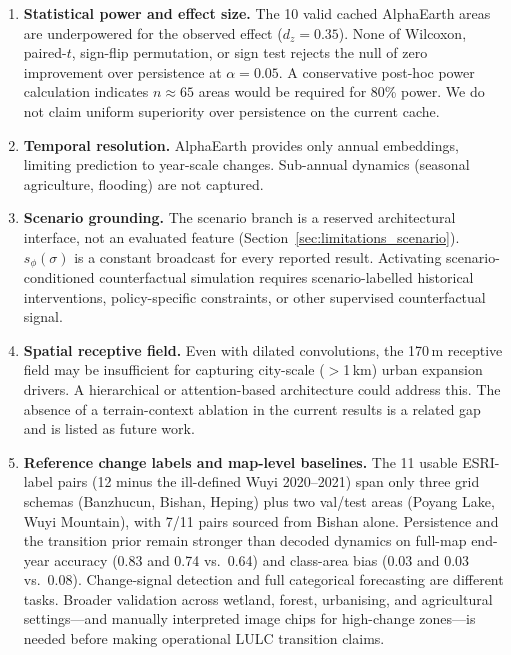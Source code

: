 \documentclass{article}
\begin{document}
\begin{enumerate}
\item \label{lim:power} \textbf{Statistical power and effect size.} The 10 valid cached AlphaEarth areas are underpowered for the observed effect ($d_z=0.35$). None of Wilcoxon, paired-$t$, sign-flip permutation, or sign test rejects the null of zero improvement over persistence at $\alpha=0.05$. A conservative post-hoc power calculation indicates $n \approx 65$ areas would be required for 80\% power. We do not claim uniform superiority over persistence on the current cache.

\item \label{lim:temporal} \textbf{Temporal resolution.} AlphaEarth provides only annual embeddings, limiting prediction to year-scale changes. Sub-annual dynamics (seasonal agriculture, flooding) are not captured.

\item \label{lim:scenario} \textbf{Scenario grounding.} The scenario branch is a reserved architectural interface, not an evaluated feature (Section~\ref{sec:limitations_scenario}). $s_\phi(\sigma)$ is a constant broadcast for every reported result. Activating scenario-conditioned counterfactual simulation requires scenario-labelled historical interventions, policy-specific constraints, or other supervised counterfactual signal.

\item \label{lim:receptive} \textbf{Spatial receptive field.} Even with dilated convolutions, the 170\,m receptive field may be insufficient for capturing city-scale ($>$1\,km) urban expansion drivers. A hierarchical or attention-based architecture could address this. The absence of a terrain-context ablation in the current results is a related gap and is listed as future work.

\item \label{lim:reference} \textbf{Reference change labels and map-level baselines.} The 11 usable ESRI-label pairs (12 minus the ill-defined Wuyi 2020--2021) span only three grid schemas (Banzhucun, Bishan, Heping) plus two val/test areas (Poyang Lake, Wuyi Mountain), with 7/11 pairs sourced from Bishan alone. Persistence and the transition prior remain stronger than decoded dynamics on full-map end-year accuracy (0.83 and 0.74 vs.\ 0.64) and class-area bias (0.03 and 0.03 vs.\ 0.08). Change-signal detection and full categorical forecasting are different tasks. Broader validation across wetland, forest, urbanising, and agricultural settings---and manually interpreted image chips for high-change zones---is needed before making operational LULC transition claims.


\end{enumerate}
\end{document}
